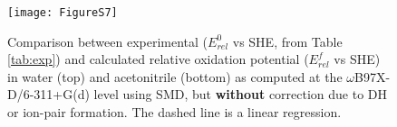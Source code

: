 \documentclass[11pt,a4paper]{article}
\begin{document}
\begin{figure}[!h]
	\centering
	\texttt{[image: FigureS7]}
	\caption{Comparison between experimental ($E^0_{rel} $ vs SHE, from Table \ref{tab:exp}) and calculated relative oxidation potential ($E^f_{rel}$ vs SHE) in water (top) and acetonitrile (bottom)  as computed at the $\omega$B97X-D/6-311+G(d) level  using SMD, but \textbf{without} correction due to DH or ion-pair formation.  The dashed line is a linear regression.}
	\label{fig:expvstheo}
\end{figure}

\clearpage



 

	
\end{document}
